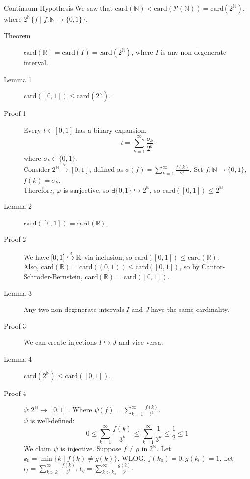 \documentclass[8pt]{extarticle}
\newcommand{\card}{\text{card}}
\newcommand{\N}{\mathbb{N}}
\newcommand{\R}{\mathbb{R}}
\begin{document}
  \begin{problem}{Continuum Hypothesis}
    We saw that $\card(\N) < \card(\mathcal{P}(\N)) = \card(2^{\N})$, where $2^\N\{f\mid f:\N\rightarrow\{0,1\}\}$.
    \begin{description}
      \item[Theorem] $\card(\R) = \card(I)=\card(2^{\N})$, where $I$ is any non-degenerate interval.
    \end{description}
    \tcblower
    \begin{description}
      \item[Lemma 1] $\card([0,1]) \leq \card(2^{\N})$.
      \item[Proof 1] Every $t\in [0,1]$ has a binary expansion.
        \[
          t = \sum_{k = 1}^{\infty} \frac{\sigma_k}{2^k}
        \] 
        where $\sigma_k \in \{0,1\}$. \\

        Consider $2^{\N} \xrightarrow{\varphi} [0,1]$, defined as $\displaystyle \phi(f) = \sum_{k=1}^{\infty}\frac{f(k)}{2^k}$. Set $f: \N \rightarrow \{0,1\}$, $f(k) = \sigma_k$.\\

          Therefore, $\varphi$ is surjective, so $\exists \{0,1\}\hookrightarrow 2^{\N}$, so $\card([0,1]) \leq 2^{\N}$
        \item[Lemma 2] $\card([0,1]) = \card(\R)$.
        \item[Proof 2] We have $[0,1]\xhookrightarrow{i} \R$ via inclusion, so $\card([0,1])\leq \card(\R)$.\\

          Also, $\card(\R) = \card((0,1)) \leq \card([0,1])$, so by Cantor-Schröder-Bernstein, $\card(\R) = \card([0,1])$.
        \item[Lemma 3] Any two non-degenerate intervals $I$ and $J$ have the same cardinality. 
        \item[Proof 3] We can create injections $I\hookrightarrow J$ and vice-versa.
        \item[Lemma 4] $\card(2^{\N}) \leq \card([0,1])$.
        \item[Proof 4] $\psi: 2^{\N} \rightarrow [0,1]$. Where $\psi(f) = \sum_{k = 1}^{\infty}\frac{f(k)}{3^k}$.\\

          $\psi$ is well-defined:
          \[
            0\leq \sum_{k=1}^{\infty}\frac{f(k)}{3^k} \leq \sum_{k=1}^{\infty}\frac{1}{3^k} \leq \frac{1}{2} \leq 1
          \] 
          We claim $\psi$ is injective. Suppose $f\neq g$ in $2^{\N}$. Let $k_0 = \min\{k\mid f(k) \neq g(k)\}$. WLOG, $f(k_0) = 0, g(k_0) = 1$. Let $t_f = \sum_{k>k_0}^{\infty}\frac{f(k)}{3^k}$, $t_g = \sum_{k>k_0}^{\infty}\frac{g(k)}{3^k}$.\\


\end{description}
\end{problem}
\end{document}

